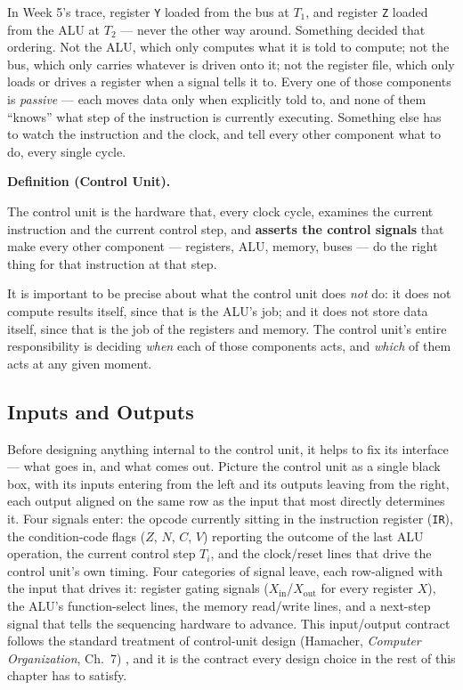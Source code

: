 \documentclass[11pt]{article}
\newenvironment{definitionbox}[1]{%
  \par\noindent\textbf{Definition (#1).}\ \itshape
}{\par\vspace{0.3em}}
\begin{document}
In Week 5's trace, register \texttt{Y} loaded from the bus at $T_1$, and register \texttt{Z} loaded from the ALU at $T_2$ --- never the other way around. Something decided that ordering. Not the ALU, which only computes what it is told to compute; not the bus, which only carries whatever is driven onto it; not the register file, which only loads or drives a register when a signal tells it to. Every one of those components is \emph{passive} --- each moves data only when explicitly told to, and none of them ``knows'' what step of the instruction is currently executing. Something else has to watch the instruction and the clock, and tell every other component what to do, every single cycle.

\begin{definitionbox}{Control Unit}
The control unit is the hardware that, every clock cycle, examines the current instruction and the current control step, and \textup{\textbf{asserts the control signals}} that make every other component --- registers, ALU, memory, buses --- do the right thing for that instruction at that step.
\end{definitionbox}

It is important to be precise about what the control unit does \emph{not} do: it does not compute results itself, since that is the ALU's job; and it does not store data itself, since that is the job of the registers and memory. The control unit's entire responsibility is deciding \emph{when} each of those components acts, and \emph{which} of them acts at any given moment.

\subsection{Inputs and Outputs}

Before designing anything internal to the control unit, it helps to fix its interface --- what goes in, and what comes out. Picture the control unit as a single black box, with its inputs entering from the left and its outputs leaving from the right, each output aligned on the same row as the input that most directly determines it. Four signals enter: the opcode currently sitting in the instruction register (\texttt{IR}), the condition-code flags ($Z$, $N$, $C$, $V$) reporting the outcome of the last ALU operation, the current control step $T_i$, and the clock/reset lines that drive the control unit's own timing. Four categories of signal leave, each row-aligned with the input that drives it: register gating signals ($X_{\text{in}}$/$X_{\text{out}}$ for every register $X$), the ALU's function-select lines, the memory read/write lines, and a next-step signal that tells the sequencing hardware to advance. This input/output contract follows the standard treatment of control-unit design (Hamacher, \textit{Computer Organization}, Ch.~7) \cite{Hamacher2002_computer_organization}, and it is the contract every design choice in the rest of this chapter has to satisfy.
\end{document}
